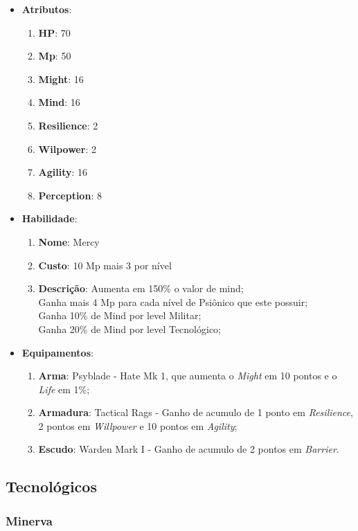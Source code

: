 \documentclass[11pt]{article} %
\begin{document}
\begin{itemize}
\item \textbf{Atributos}:
  \begin{enumerate}
    \item \textbf{HP}: 70
    \item \textbf{Mp}: 50
    \item \textbf{Might}: 16
    \item \textbf{Mind}: 16
    \item \textbf{Resilience}: 2
    \item \textbf{Wilpower}: 2
    \item \textbf{Agility}: 16
    \item \textbf{Perception}: 8
  \end{enumerate}
\item \textbf{Habilidade}:
  \begin{enumerate}
    \item \textbf{Nome}: Mercy
    \item \textbf{Custo}: 10 Mp mais 3 por nível
    \item \textbf{Descrição}: Aumenta em 150\% o valor de mind;\\
    Ganha mais 4 Mp para cada nível de Psiônico que este possuir;\\
    Ganha 10\% de Mind por level Militar;\\
    Ganha 20\% de Mind por level Tecnológico;\\
  \end{enumerate}
\item \textbf{Equipamentos}:
  \begin{enumerate}
    \item \textbf{Arma}: Psyblade - Hate Mk 1, que aumenta o \textit{Might} em 10 pontos e o \textit{Life} em 1\%;
    \item \textbf{Armadura}: Tactical Rags - Ganho de acumulo de 1 ponto em \textit{Resilience}, 2 pontos em \textit{Willpower} e 10 pontos em \textit{Agility};
    \item \textbf{Escudo}: Warden Mark I - Ganho de acumulo de 2 pontos em \textit{Barrier}.
  \end{enumerate}
\end{itemize}

\subsection{Tecnológicos}

\subsubsection{Minerva}
\end{document}
